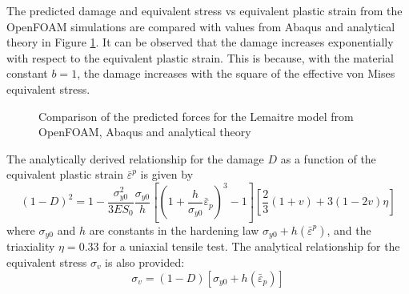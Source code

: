 \documentclass[sn-mathphys,Numbered]{sn-jnl}%
\begin{document}
\begin{appendices}
The predicted damage and equivalent stress vs equivalent plastic strain from the OpenFOAM simulations are compared with values from Abaqus and analytical theory \citep{doghri_numerical_1995} in Figure \ref{fig:lemaitre_one_elem_force}.
It can be observed that the damage increases exponentially with respect to the equivalent plastic strain.
This is because, with the material constant $b=1$, the damage increases with the square of the effective von Mises equivalent stress.
\begin{figure}[htbp]
	\centering
	\caption{Comparison of the predicted forces for the Lemaitre model from OpenFOAM, Abaqus and analytical theory}
	\label{fig:lemaitre_one_elem_force}
\end{figure}

The analytically derived relationship for the damage $D$ as a function of the equivalent plastic strain ${\bar{\varepsilon}}^p$ is given by
\begin{equation}
	(1-D)^2=1-\frac{\sigma_{y0}^2}{3 E S_0} \frac{\sigma_{y0}}{h}\left[\left(1+\frac{h}{\sigma_{y0}} {\bar{\varepsilon}}_p\right)^3-1\right] \left[ \frac{2}{3}(1+v)+3(1-2v)\eta \right]
\end{equation}
where $\sigma_{y0}$ and $h$ are constants in the hardening law $\sigma_{y0}+h({\bar{\varepsilon}}^p)$, and the triaxiality $\eta=0.33$ for a uniaxial tensile test.
The analytical relationship for the equivalent stress $\sigma_{v}$ is also provided:
\begin{equation}
    \sigma_{v}=(1-D)\left[\sigma_{y0}+h({\bar{\varepsilon}}_p)\right]
\end{equation}



\end{appendices}
\end{document}
